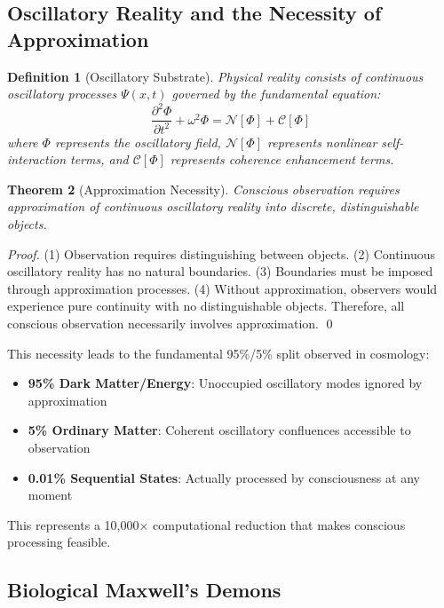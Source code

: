 \documentclass[11pt,twocolumn]{article}
\newtheorem{theorem}{Theorem}[section]
\newtheorem{definition}[theorem]{Definition}
\theoremstyle{remark}
\begin{document}
\subsection{Oscillatory Reality and the Necessity of Approximation}

\begin{definition}[Oscillatory Substrate]
Physical reality consists of continuous oscillatory processes $\Psi(x,t)$ governed by the fundamental equation:
\begin{equation}
\frac{\partial^2 \Phi}{\partial t^2} + \omega^2 \Phi = \mathcal{N}[\Phi] + \mathcal{C}[\Phi]
\end{equation}
where $\Phi$ represents the oscillatory field, $\mathcal{N}[\Phi]$ represents nonlinear self-interaction terms, and $\mathcal{C}[\Phi]$ represents coherence enhancement terms.
\end{definition}

\begin{theorem}[Approximation Necessity]
Conscious observation requires approximation of continuous oscillatory reality into discrete, distinguishable objects.
\end{theorem}

\begin{proof}
(1) Observation requires distinguishing between objects. (2) Continuous oscillatory reality has no natural boundaries. (3) Boundaries must be imposed through approximation processes. (4) Without approximation, observers would experience pure continuity with no distinguishable objects. Therefore, all conscious observation necessarily involves approximation. \qed
\end{proof}

This necessity leads to the fundamental 95\%/5\% split observed in cosmology:
\begin{itemize}
\item \textbf{95\% Dark Matter/Energy}: Unoccupied oscillatory modes ignored by approximation
\item \textbf{5\% Ordinary Matter}: Coherent oscillatory confluences accessible to observation
\item \textbf{0.01\% Sequential States}: Actually processed by consciousness at any moment
\end{itemize}

This represents a 10,000× computational reduction that makes conscious processing feasible.

\subsection{Biological Maxwell's Demons}
\end{document}
